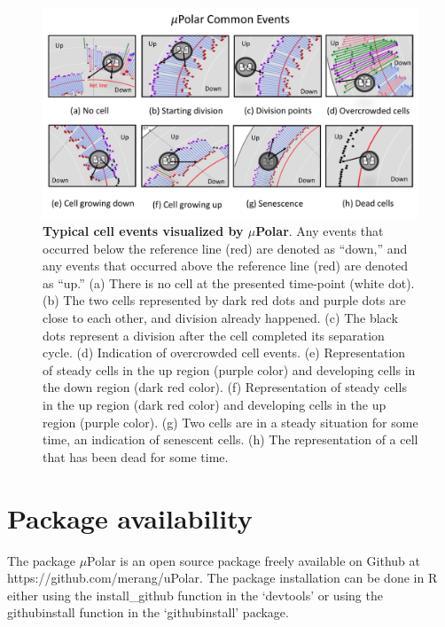 \documentclass[conference]{IEEEtran}
\begin{document}
\begin{figure}
\centering
\includegraphics[width=\textwidth,height=10 cm]{Patterns/read.pdf}
\caption{\textbf{ Typical cell events visualized by $\mu$Polar}. Any events that occurred below the reference line (red) are denoted as ``down,'' and any events that occurred above the reference line (red) are denoted as ``up.'' (a) There is no cell at the presented time-point (white dot).
(b) The two cells represented by dark red dots and purple dots are close to each other, and division already happened. (c) The black dots represent a division after the cell completed its separation cycle. (d) Indication of overcrowded cell events. (e) Representation of steady cells in the up region (purple color) and developing cells in the down region (dark red color). (f) Representation of steady cells in the up region (dark red color) and developing cells in the up region (purple color). (g) Two cells are in a steady situation for some time, an indication of senescent cells. (h) The representation of a cell that has been dead for some time. }
\label{fig:read}
\end{figure}


\section{Package availability}
The package $\mu$Polar is an open source package freely available on Github at https://github.com/merang/uPolar. The package installation can be done in R either using the install\_github function in the ‘devtools’ or using the githubinstall function in the ‘githubinstall’ package. 
\end{document}
